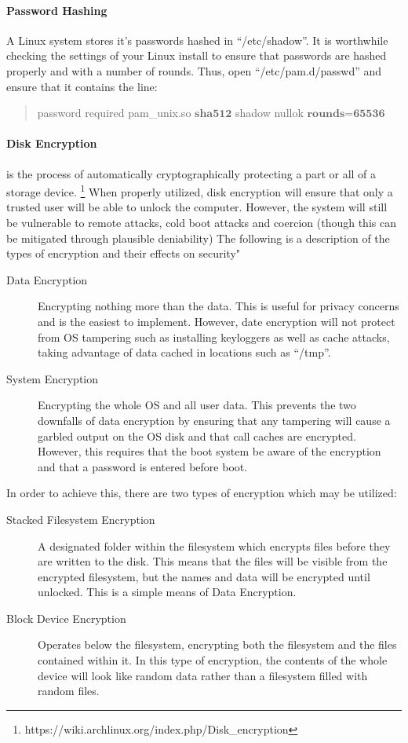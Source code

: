 \documentclass[a4paper,11pt]{article}
\begin{document}
		\paragraph{Password Hashing}
			A Linux system stores it's passwords hashed in ``/etc/shadow''. 
			It is worthwhile checking the settings of your Linux install to ensure that passwords are hashed properly and with a number of rounds. Thus, open ``/etc/pam.d/passwd'' and ensure that it contains the line:
			\begin{quote}
				password	required	pam\_unix.so $\textbf{sha512}$ shadow nullok $\textbf{rounds=65536}$
			\end{quote}
		\paragraph{Disk Encryption}
			is the process of automatically cryptographically protecting a part or all of a storage device.
			\footnote{https://wiki.archlinux.org/index.php/Disk\_encryption}
			When properly utilized, disk encryption will ensure that only a trusted user will be able to unlock the computer. 
			However, the system will still be vulnerable to remote attacks, cold boot attacks and coercion (though this can be mitigated through plausible deniability)
			The following is a description of the types of encryption and their effects on security"
			\begin{description}
				\item[Data Encryption] Encrypting nothing more than the data. 
					This is useful for privacy concerns and is the easiest to implement. 
					However, date encryption will not protect from OS tampering such as installing keyloggers as well as cache attacks, taking advantage of data cached in locations such as ``/tmp''.
				\item[System Encryption] Encrypting the whole OS and all user data. 
					This prevents the two downfalls of data encryption by ensuring that any tampering will cause a garbled output on the OS disk and that call caches are encrypted. 
					However, this requires that the boot system be aware of the encryption and that a password is entered before boot. 
			\end{description}
			In order to achieve this, there are two types of encryption which may be utilized:
			\begin{description}
				\item[Stacked Filesystem Encryption] A designated folder within the filesystem which encrypts files before they are written to the disk. 
					This means that the files will be visible from the encrypted filesystem, but the names and data will be encrypted until unlocked. 
					This is a simple means of Data Encryption. 
				\item[Block Device Encryption] Operates below the filesystem, encrypting both the filesystem and the files contained within it. 
					In this type of encryption, the contents of the whole device will look like random data rather than a filesystem filled with random files. 
			\end{description}
\end{document}
